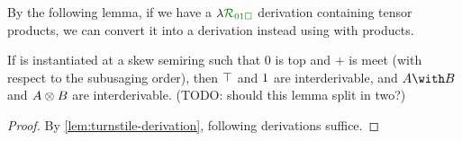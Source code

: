 \documentclass[submission,copyright,creativecommons]{eptcs}
\begin{document}
By the following lemma, if we have a $\name_\instPD$ derivation containing tensor
products, we can convert it into a derivation instead using with products.

\begin{lemma}
  If \name{} is instantiated at a skew semiring such that $0$ is top and $+$ is
  meet (with respect to the subusaging order), then $\top$ and
  $1$ are interderivable, and $\withT A B$ and $A \otimes B$ are
  interderivable. (TODO: should this lemma split in two?)
\end{lemma}
\begin{proof}
  By \autoref{lem:turnstile-derivation}, following derivations suffice.
\end{proof}
\end{document}
